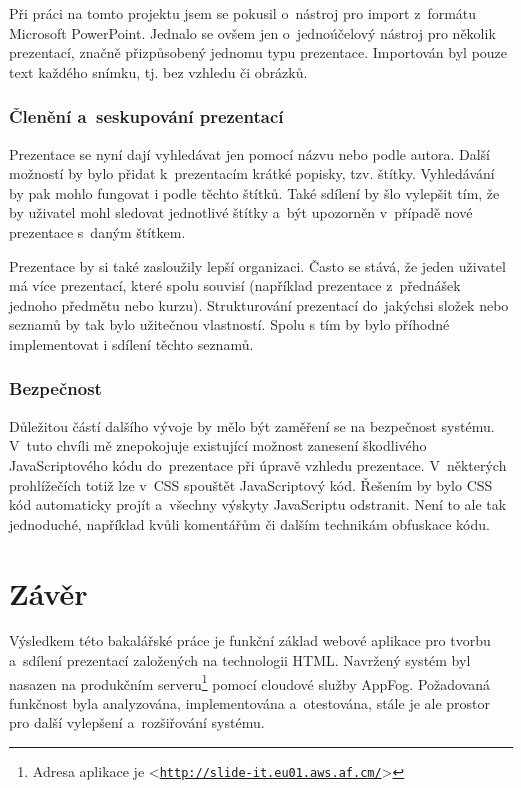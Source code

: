 \documentclass[11pt,twoside,a4paper]{book}
\let\oldUrl\url									%
\renewcommand\url[1]{<\texttt{\oldUrl{#1}}>}
\begin{document}
Při práci na tomto projektu jsem se pokusil o~nástroj pro import z~formátu Microsoft PowerPoint. Jednalo se ovšem jen o~jednoúčelový nástroj pro několik prezentací, značně přizpůsobený jednomu typu prezentace. Importován byl pouze text každého snímku, tj. bez vzhledu či obrázků.

\subsection{Členění a~seskupování prezentací}
Prezentace se nyní dají vyhledávat jen pomocí názvu nebo podle autora. Další možností by bylo přidat k~prezentacím krátké popisky, tzv. štítky. Vyhledávání by pak mohlo fungovat i podle těchto štítků. Také sdílení by šlo vylepšit tím, že by uživatel mohl sledovat jednotlivé štítky a~být upozorněn v~případě nové prezentace s~daným štítkem.

Prezentace by si také zasloužily lepší organizaci. Často se stává, že jeden uživatel má více prezentací, které spolu souvisí (například prezentace z~přednášek jednoho předmětu nebo kurzu). Strukturování prezentací do~jakýchsi složek nebo seznamů by tak bylo užitečnou vlastností. Spolu s tím by bylo příhodné implementovat i sdílení těchto seznamů.

\subsection{Bezpečnost}
Důležitou částí dalšího vývoje by mělo být zaměření se na bezpečnost systému. V~tuto chvíli mě znepokojuje existující možnost zanesení škodlivého Java\-Scriptového kódu do~prezentace při úpravě vzhledu prezentace. V~některých prohlížečích totiž lze v~CSS spouštět Java\-Scriptový kód. Řešením by bylo CSS kód automaticky projít a~všechny výskyty Java\-Scriptu odstranit. Není to ale tak jednoduché, například kvůli komentářům či dalším technikám obfuskace kódu.


\chapter{Závěr}
Výsledkem této bakalářské práce je funkční základ webové aplikace pro tvorbu a~sdílení prezentací založených na technologii HTML. Navržený systém byl nasazen na produkčním serveru\footnote{Adresa aplikace je \url{http://slide-it.eu01.aws.af.cm/}} pomocí cloudové služby AppFog. Požadovaná funkčnost byla analyzována, imple\-mentována a~otestována, stále je ale prostor pro další vylepšení a~rozšiřování systému.
\end{document}
